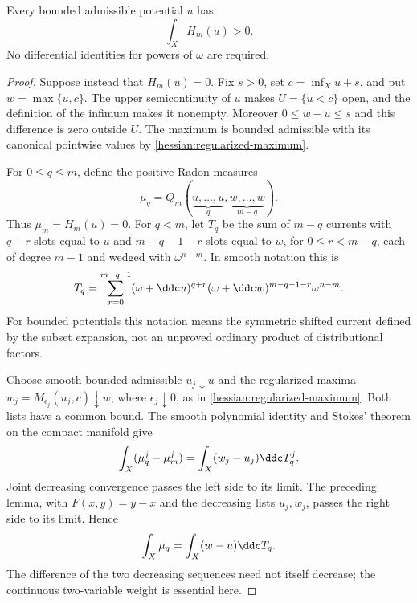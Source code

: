 \begin{proposition}\label{draft633:bounded-nonvanishing}
Every bounded admissible potential $u$ has
\[
 \int_X H_m(u)>0.
\]
No differential identities for powers of $\omega$ are required.
\end{proposition}
\begin{proof}
Suppose instead that $H_m(u)=0$. Fix $s>0$, set
$c=\inf_Xu+s$, and put $w=\max\{u,c\}$.
The upper semicontinuity of $u$ makes
$U=\{u<c\}$ open, and the definition of the infimum makes it
nonempty. Moreover $0\leq w-u\leq s$ and this difference is
zero outside $U$. The maximum is bounded admissible with its
canonical pointwise values by \cref{hessian:regularized-maximum}.

For $0\leq q\leq m$, define the positive Radon measures
\[
 \mu_q=Q_m(\underbrace{u,\ldots,u}_{q},
                    \underbrace{w,\ldots,w}_{m-q}).
\]
Thus $\mu_m=H_m(u)=0$. For $q<m$, let $T_q$ be the sum of
$m-q$ currents with $q+r$ slots equal to $u$ and
$m-q-1-r$ slots equal to $w$, for $0\leq r<m-q$, each of degree
$m-1$ and wedged with $\omega^{n-m}$. In smooth notation this is
\[
 T_q=\sum_{r=0}^{m-q-1}
       (\omega+\ddc u)^{q+r}
       (\omega+\ddc w)^{m-q-1-r}\omega^{n-m}.
\]
For bounded potentials this notation means the symmetric shifted
current defined by the subset expansion, not an unproved ordinary
product of distributional factors.

Choose smooth bounded admissible $u_j\downarrow u$ and the
regularized maxima $w_j=M_{\epsilon_j}(u_j,c)\downarrow w$,
where $\epsilon_j\downarrow0$, as in
\cref{hessian:regularized-maximum}.
Both lists have a common bound. The smooth polynomial identity and
Stokes' theorem on the compact manifold give
\[
 \int_X(\mu_q^j-\mu_m^j)
              =\int_X(w_j-u_j)\ddc T_q^j.
\]
Joint decreasing convergence passes the left side to its limit.
The preceding lemma, with $F(x,y)=y-x$ and the decreasing lists
$u_j,w_j$, passes the right side to its limit. Hence
\[
 \int_X\mu_q=\int_X(w-u)\ddc T_q.
\]
The difference of the two decreasing sequences need not itself
decrease; the continuous two-variable weight is essential here.


\end{proof}
